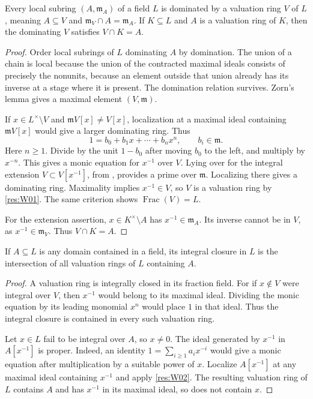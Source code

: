 \begin{theorem}\label{res:W02}
Every local subring \((A,\mathfrak m_A)\) of a field \(L\) is dominated by a valuation ring \(V\) of \(L\), meaning \(A\subseteq V\) and \(\mathfrak m_V\cap A=\mathfrak m_A\). If \(K\subseteq L\) and \(A\) is a valuation ring of \(K\), then the dominating \(V\) satisfies \(V\cap K=A\).
\end{theorem}
\begin{proof}
Order local subrings of \(L\) dominating \(A\) by domination. The union of a chain is local because the union of the contracted maximal ideals consists of precisely the nonunits, because an element outside that union already has its inverse at a stage where it is present. The domination relation survives. Zorn's lemma gives a maximal element \((V,\mathfrak m)\).

If \(x\in L^\times\setminus V\) and \(\mathfrak m V[x]\ne V[x]\), localization at a maximal ideal containing \(\mathfrak m V[x]\) would give a larger dominating ring. Thus
\[
           1=b_0+b_1x+\cdots+b_nx^n,\qquad b_i\in\mathfrak m.
\]
Here \(n\ge1\). Divide by the unit \(1-b_0\) after moving \(b_0\) to the left, and multiply by \(x^{-n}\). This gives a monic equation for \(x^{-1}\) over \(V\). Lying over for the integral extension \(V\subset V[x^{-1}]\), from \cite[ALG-05-C01-R03]{p103}, provides a prime over \(\mathfrak m\). Localizing there gives a dominating ring. Maximality implies \(x^{-1}\in V\), so \(V\) is a valuation ring by \ref{res:W01}. The same criterion shows \(\operatorname{Frac}(V)=L\).

For the extension assertion, \(x\in K^\times\setminus A\) has \(x^{-1}\in\mathfrak m_A\). Its inverse cannot be in \(V\), as \(x^{-1}\in\mathfrak m_V\). Thus \(V\cap K=A\).
\end{proof}

\begin{theorem}\label{res:W03}
If \(A\subseteq L\) is any domain contained in a field, its integral closure in \(L\) is the intersection of all valuation rings of \(L\) containing \(A\).
\end{theorem}
\begin{proof}
A valuation ring is integrally closed in its fraction field. For if \(x\notin V\) were integral over \(V\), then \(x^{-1}\) would belong to its maximal ideal. Dividing the monic equation by its leading monomial \(x^n\) would place \(1\) in that ideal. Thus the integral closure is contained in every such valuation ring.

Let \(x\in L\) fail to be integral over \(A\), so \(x\ne0\). The ideal generated by \(x^{-1}\) in \(A[x^{-1}]\) is proper. Indeed, an identity \(1=\sum_{i\ge1}a_i x^{-i}\) would give a monic equation after multiplication by a suitable power of \(x\). Localize \(A[x^{-1}]\) at any maximal ideal containing \(x^{-1}\) and apply \ref{res:W02}. The resulting valuation ring of \(L\) contains \(A\) and has \(x^{-1}\) in its maximal ideal, so does not contain \(x\).
\end{proof}


